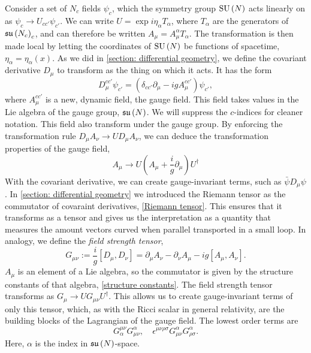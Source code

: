 Consider a set of $N_c$ fields $\psi_c$, which the symmetry group $\text{SU}\left(N\right)$ acts linearly on as $\psi_c \rightarrow U_{cc'} \psi_{c'}$.
We can write $U = \exp{i \eta_\alpha T_\alpha}$, where $T_\alpha$ are the generators of $\mathfrak{su}\left(N_c\right)_c$, and can therefore be written $A_\mu = A_\mu^\alpha T_\alpha$.
The transformation is then made local by letting the coordinates of $\text{SU}\left(N\right)$ be functions of spacetime, $\eta_\alpha = \eta_\alpha(x)$.
As we did in \autoref{section: differential geometry}, we define the covariant derivative $D_\mu$ to transform as the thing on which it acts.
It has the form
%
\begin{equation}
    \label{covariant derivative Yang-Mills}
    D_\mu^{cc'} \psi_{c'} = (\delta_{cc'}\partial_\mu - i g A_\mu^{cc'} )\psi_{c'},
\end{equation}
%
where $A_\mu^{cc'}$ is a new, dynamic field, the gauge field.
This field takes values in the Lie algebra of the gauge group, $\mathfrak{su}\left(N\right)$.
We will suppress the $c$-indices for cleaner notation.
This field also transform under the gauge group.
By enforcing the transformation rule $D_\mu A_\nu \rightarrow U D_\mu A_\nu$, we can deduce the transformation properties of the gauge field, 
%
\begin{equation}
    \label{Gauge transformation gauge field}
    A_\mu\rightarrow U \left(A_\mu + \frac{i}{g} \partial_\mu\right) U^\dagger
\end{equation}
%
With the covariant derivative, we can create gauge-invariant terms, such as $\bar \psi D_\mu \psi$.
In \autoref{section: differential geometry} we introduced the Riemann tensor as the commutator of covaraint derivatives, \autoref{Riemann tensor}.
This ensures that it transforms as a tensor and gives us the interpretation as a quantity that measures the amount vectors curved when parallel transported in a small loop.
In analogy, we define the \emph{field strength tensor},
%
\begin{equation}
    G_{\mu \nu} := \frac{i}{g} [D_\mu, D_\nu]
    = \partial_\mu A_\nu - \partial_\nu A_\mu - i g[A_\mu, A_\nu].
\end{equation}
%
$A_\mu$ is an element of a Lie algebra, so the commutator is given by the structure constants of that algebra, \autoref{structure constants}.
The field strength tensor transforms as $G_\mu \rightarrow U G_{\mu \nu}U^\dagger$.
This allows us to create gauge-invariant terms of only this tensor, which, as with the Ricci scalar in general relativity, are the building blocks of the Lagrangian of the gauge field.
The lowest order terms are
%
\begin{equation}
    G^{\mu \nu}_\alpha G_{\mu \nu}^\alpha, \quad
    \epsilon^{\mu \nu \rho \sigma} G_{\mu \nu}^\alpha G_{\rho \sigma}^\alpha.
\end{equation}
%
Here, $\alpha$ is the index in $\mathfrak{su}\left(N\right)$-space.

